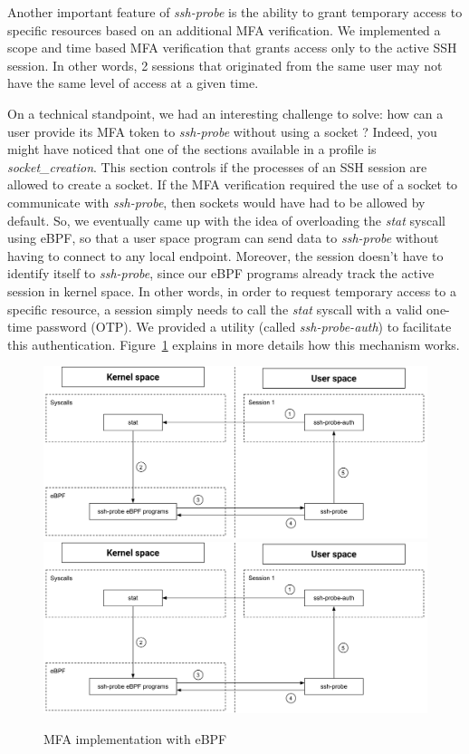 Another important feature of \emph{ssh-probe} is the ability to grant temporary access to specific resources based on an additional MFA verification.
We implemented a scope and time based MFA verification that grants access only to the active SSH session.
In other words, 2 sessions that originated from the same user may not have the same level of access at a given time.

On a technical standpoint, we had an interesting challenge to solve: how can a user provide its MFA token to \emph{ssh-probe} without using a socket ?
Indeed, you might have noticed that one of the sections available in a profile is \emph{socket\_creation}.
This section controls if the processes of an SSH session are allowed to create a socket.
If the MFA verification required the use of a socket to communicate with \emph{ssh-probe}, then sockets would have had to be allowed by default.
So, we eventually came up with the idea of overloading the \emph{stat} syscall using eBPF, so that a user space program can send data to \emph{ssh-probe} without having to connect to any local endpoint.
Moreover, the session doesn’t have to identify itself to \emph{ssh-probe}, since our eBPF programs already track the active session in kernel space.
In other words, in order to request temporary access to a specific resource, a session simply needs to call the \emph{stat} syscall with a valid one-time password (OTP).
We provided a utility (called \emph{ssh-probe-auth}) to facilitate this authentication.
Figure~\ref{fig:MonitoringAndProtectingSSHSessionsWithEBPF:MFA} explains in more details how this mechanism works.

\begin{figure}[ht]
  \centering
  \ifssticbw
  \includegraphics[width=\textwidth]{MonitoringAndProtectingSSHSessionsWithEBPF/img/mfa}
  \else
  \includegraphics[width=\textwidth]{MonitoringAndProtectingSSHSessionsWithEBPF/img/mfa}
  \fi
  \caption{MFA implementation with eBPF}
  \label{fig:MonitoringAndProtectingSSHSessionsWithEBPF:MFA}
\end{figure}


